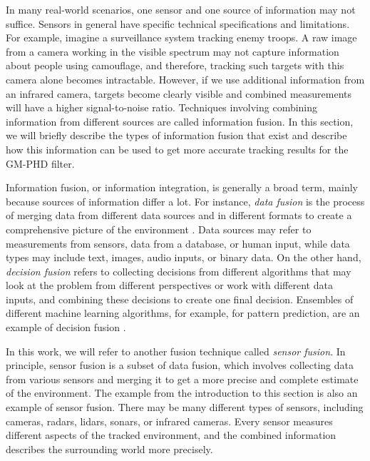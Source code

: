 In many real-world scenarios, one sensor and one source of information may not suffice. Sensors in general have specific technical specifications and limitations. For example, imagine a surveillance system tracking enemy troops. A raw image from a camera working in the visible spectrum may not capture information about people using camouflage, and therefore, tracking such targets with this camera alone becomes intractable. However, if we use additional information from an infrared camera, targets become clearly visible and combined measurements will have a higher signal-to-noise ratio. Techniques involving combining information from different sources are called information fusion. In this section, we will briefly describe the types of information fusion that exist and describe how this information can be used to get more accurate tracking results for the GM-PHD filter.

Information fusion, or information integration, is generally a broad term, mainly because sources of information differ a lot. For instance, \textit{data fusion} is the process of merging data from different data sources and in different formats to create a comprehensive picture of the environment \cite{kleinSensorDataFusion2004}. Data sources may refer to measurements from sensors, data from a database, or human input, while data types may include text, images, audio inputs, or binary data. On the other hand, \textit{decision fusion} refers to collecting decisions from different algorithms that may look at the problem from different perspectives or work with different data inputs, and combining these decisions to create one final decision. Ensembles of different machine learning algorithms, for example, for pattern prediction, are an example of decision fusion \cite{mangaiSurveyDecisionFusion2010}.

In this work, we will refer to another fusion technique called \textit{sensor fusion}. In principle, sensor fusion is a subset of data fusion, which involves collecting data from various sensors and merging it to get a more precise and complete estimate of the environment. The example from the introduction to this section is also an example of sensor fusion. There may be many different types of sensors, including cameras, radars, lidars, sonars, or infrared cameras. Every sensor measures different aspects of the tracked environment, and the combined information describes the surrounding world more precisely.

